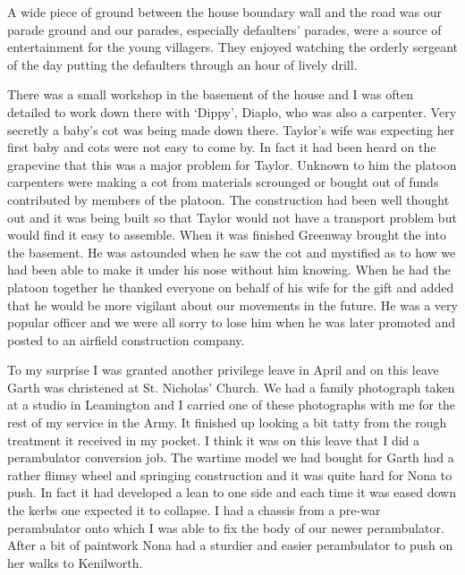 A wide piece of ground between the house boundary wall and the road
was our parade ground and our parades, especially defaulters'
parades, were a source of entertainment for the young villagers.
They enjoyed watching the orderly sergeant of the day putting the
defaulters through an hour of lively drill.

There was a small workshop in the basement of the house and I was
often detailed to work down there with `Dippy', \lcorporal Diaplo,
who was also a carpenter. Very secretly a baby's cot was being made
down there. \Lieutenant Taylor's wife was expecting her first baby and
cots were not easy to come by. In fact it had been heard on the
grapevine that this was a major problem for \lieutenant Taylor. Unknown to him
the platoon carpenters were making a cot from materials scrounged or
bought out of funds contributed by members of the platoon. The
construction had been well thought out and it was being built so that
\lieutenant Taylor would not have a transport problem but would find it easy
to assemble. When it was finished \sergeant Greenway brought the
\lieutenant into the basement. He was astounded when he saw the cot and
mystified as to how we had been able to make it under his nose without
him knowing. When he had the platoon together he thanked everyone on
behalf of his wife for the gift and added that he would be more
vigilant about our movements in the future. He was a very popular
officer and we were all sorry to lose him when he was later promoted
and posted to an airfield construction company.

To my surprise I was granted another privilege leave in April and on
this leave Garth was christened at St. Nicholas' Church. We
had a family photograph taken at a studio in Leamington and I carried
one of these photographs with me for the rest of my service in the
Army. It finished up looking a bit tatty from the rough treatment it
received in my pocket. I think it was on this leave that I did a
perambulator conversion job. The wartime model we had bought for
Garth had a rather flimsy wheel and springing construction and it was
quite hard for Nona to push. In fact it had developed a lean to one
side and each time it was eased down the kerbs one expected
it to collapse. I had a chassis from a pre-war perambulator onto
which I was able to fix the body of our newer perambulator. After a
bit of paintwork Nona had a sturdier and easier perambulator to push
on her walks to Kenilworth.

